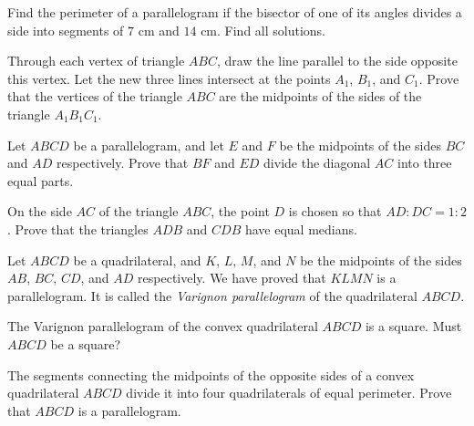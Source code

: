 \documentclass{article}
\begin{document}
\CreateTitle

\problem

Find the perimeter of a parallelogram if the bisector of one of its angles divides a side into segments of $7$ cm and $14$ cm. Find all solutions.

\eproblem

\problem

Through each vertex of triangle $ABC$, draw the line parallel to the side opposite this vertex. Let the new three lines intersect at the points $A_1$, $B_1$, and $C_1$. Prove that the vertices of the triangle $ABC$ are the midpoints of the sides of the triangle $A_1 B_1 C_1$.

\eproblem

\problem

Let $ABCD$ be a parallelogram, and let $E$ and $F$ be the midpoints of the sides $BC$ and $AD$ respectively. Prove that $BF$ and $ED$ divide the diagonal $AC$ into three equal parts.

\eproblem

\problem

On the side $AC$ of the triangle $ABC$, the point $D$ is chosen so that $AD : DC = 1 : 2$. Prove that the triangles $ADB$ and $CDB$ have equal medians.

\eproblem


Let $ABCD$ be a quadrilateral, and $K$, $L$, $M$, and $N$ be the midpoints of the sides $AB$, $BC$, $CD$, and $AD$ respectively. We have proved that $KLMN$ is a parallelogram. It is called the \emph{Varignon parallelogram} of the quadrilateral $ABCD$.\\

\edefinition


\problem

The Varignon parallelogram of the convex quadrilateral $ABCD$ is a square. Must $ABCD$ be a square?

\eproblem

\problem

The segments connecting the midpoints of the opposite sides of a convex quadrilateral $ABCD$ divide it into four quadrilaterals of equal perimeter. Prove that $ABCD$ is a parallelogram.

\eproblem
\end{document}
